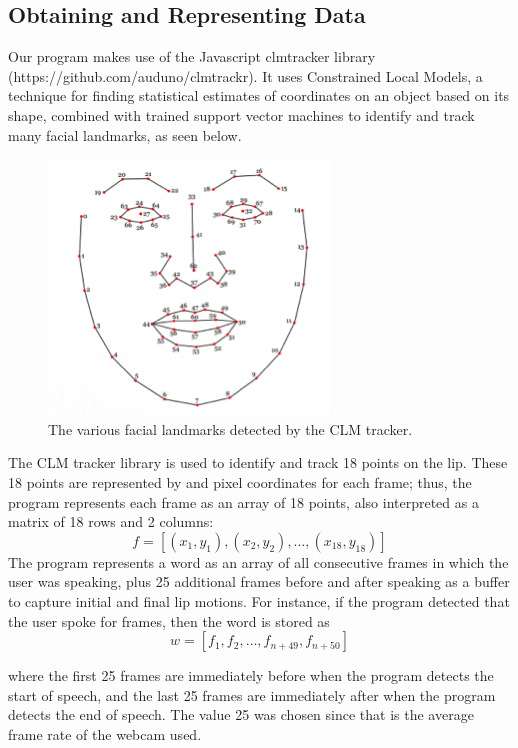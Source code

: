 \documentclass[10pt,twocolumn,letterpaper]{article}
\begin{document}
\subsection{Obtaining and Representing Data}
Our program makes use of the Javascript clmtracker library (https://github.com/auduno/clmtrackr).
It uses Constrained Local Models, a technique for finding statistical estimates of coordinates on an object based on its shape, combined with trained support vector machines to identify and track many facial landmarks, as seen below.

\begin{figure}[h]
\centering
\includegraphics{bo1}
\caption{The various facial landmarks detected by the CLM tracker.}
\end{figure}

The CLM tracker library is used to identify and track 18 points on the lip. These 18 points are represented by and pixel coordinates for each frame; thus, the program represents each frame as an array of 18 points, also interpreted as a matrix of 18 rows and 2 columns:
\begin{equation}
  f = [(x_1, y_1), (x_2, y_2), \ldots, (x_{18}, y_{18})]
\end{equation}
The program represents a word as an array of all consecutive frames in which the user was speaking, plus 25 additional frames before and after speaking as a buffer to capture initial and final lip motions. For instance, if the program detected that the user spoke for frames, then the word is stored as
\begin{equation}
  w = [f_1, f_2, \ldots, f_{n+49}, f_{n+50}]
\end{equation}

where the first 25 frames are immediately before when the program detects the start of speech, and the last 25 frames are immediately after when the program detects the end of speech. The value 25 was chosen since that is the average frame rate of the webcam used.
\end{document}
